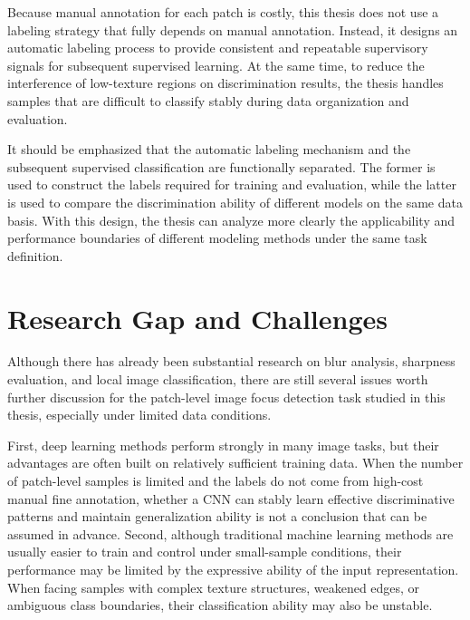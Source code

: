 \par Because manual annotation for each patch is costly, this thesis does not
use a labeling strategy that fully depends on manual annotation. Instead, it
designs an automatic labeling process \cite{5739529,1284395} to provide
consistent and repeatable supervisory signals for subsequent supervised
learning. At the same time, to reduce the interference of low-texture regions
on discrimination results, the thesis handles samples that are difficult to
classify stably during data organization and evaluation.

\par It should be emphasized that the automatic labeling mechanism and the
subsequent supervised classification are functionally separated. The former is
used to construct the labels required for training and evaluation, while the
latter is used to compare the discrimination ability of different models on the
same data basis. With this design, the thesis can analyze more clearly the
applicability and performance boundaries of different modeling methods under
the same task definition.

\section{Research Gap and Challenges}

\par Although there has already been substantial research on blur analysis,
sharpness evaluation, and local image classification, there are still several
issues worth further discussion for the patch-level image focus detection task
studied in this thesis, especially under limited data conditions.

\par First, deep learning methods perform strongly in many image tasks, but
their advantages are often built on relatively sufficient training data. When
the number of patch-level samples is limited and the labels do not come from
high-cost manual fine annotation, whether a CNN can stably learn effective
discriminative patterns and maintain generalization ability is not a conclusion
that can be assumed in advance. Second, although traditional machine learning
methods are usually easier to train and control under small-sample conditions,
their performance may be limited by the expressive ability of the input
representation. When facing samples with complex texture structures, weakened
edges, or ambiguous class boundaries, their classification ability may also be
unstable.

